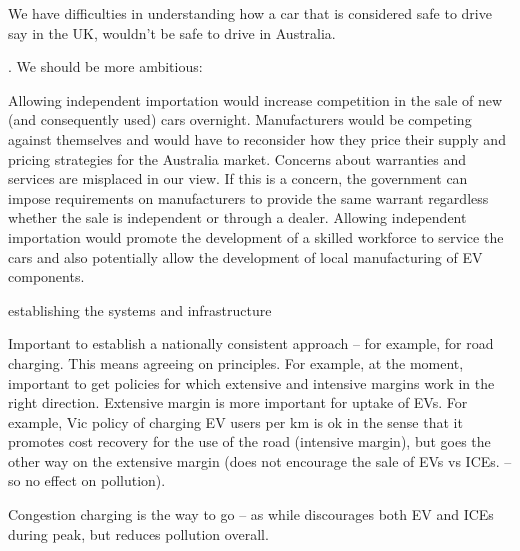         We have difficulties in understanding how a car that is considered safe
        to drive say in the UK, wouldn’t be safe to drive in Australia.

        . We should be more ambitious:

            Allowing independent importation would increase competition in the
            sale of new (and consequently used) cars overnight. Manufacturers
            would be competing against themselves and would have to reconsider
            how they price their supply and pricing strategies for the
            Australia market.  Concerns about warranties and services are
            misplaced in our view.  If this is a concern, the government can
            impose requirements on manufacturers to provide the same warrant
            regardless whether the sale is independent or through a dealer.
            Allowing independent importation would promote the development of a
            skilled workforce to service the cars and also potentially allow
            the development of local manufacturing of EV components. 

 

        establishing the systems and infrastructure

 

    Important to establish a nationally consistent approach – for example, for
    road charging. This means agreeing on principles. For example, at the
    moment, important to get policies for which extensive and intensive margins
    work in the right direction. Extensive margin is more important for uptake
    of EVs. For example, Vic policy of charging EV users per km is ok in the
    sense that it promotes cost recovery for the use of the road (intensive
    margin), but goes the other way on the extensive margin (does not encourage
    the sale of EVs vs ICEs. – so no effect on pollution).

    Congestion charging is the way to go – as while discourages both EV and
    ICEs during peak, but reduces pollution overall. 
